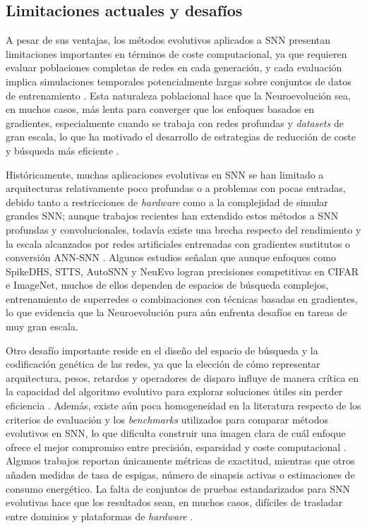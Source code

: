 \subsection{Limitaciones actuales y desafíos}
A pesar de sus ventajas, los métodos evolutivos aplicados a SNN presentan limitaciones importantes en términos de coste computacional, ya que requieren evaluar poblaciones completas de redes en cada generación, y cada evaluación implica simulaciones temporales potencialmente largas sobre conjuntos de datos de entrenamiento \cite{Schuman2022Opportunities, Schuman2020evooptineuro}. Esta naturaleza poblacional hace que la Neuroevolución sea, en muchos casos, más lenta para converger que los enfoques basados en gradientes, especialmente cuando se trabaja con redes profundas y \textit{datasets} de gran escala, lo que ha motivado el desarrollo de estrategias de reducción de coste y búsqueda más eficiente \cite{Shen2024EvolutionarySNN, Branquinho2023-neuro-conv-snn}.

Históricamente, muchas aplicaciones evolutivas en SNN se han limitado a arquitecturas relativamente poco profundas o a problemas con pocas entradas, debido tanto a restricciones de \textit{hardware} como a la complejidad de simular grandes SNN; aunque trabajos recientes han extendido estos métodos a SNN profundas y convolucionales, todavía existe una brecha respecto del rendimiento y la escala alcanzados por redes artificiales entrenadas con gradientes sustitutos o conversión ANN-SNN \cite{Branquinho2023-neuro-conv-snn, Schliebs2013snn-survey}. Algunos estudios \cite{Shen2024EvolutionarySNN} señalan que aunque enfoques como SpikeDHS, STTS, AutoSNN y NeuEvo logran precisiones competitivas en CIFAR e ImageNet, muchos de ellos dependen de espacios de búsqueda complejos, entrenamiento de superredes o combinaciones con técnicas basadas en gradientes, lo que evidencia que la Neuroevolución pura aún enfrenta desafíos en tareas de muy gran escala.

Otro desafío importante reside en el diseño del espacio de búsqueda y la codificación genética de las redes, ya que la elección de cómo representar arquitectura, pesos, retardos y operadores de disparo influye de manera crítica en la capacidad del algoritmo evolutivo para explorar soluciones útiles sin perder eficiencia \cite{Elbrecht2020-neuro-snn}. Además, existe aún poca homogeneidad en la literatura respecto de los criterios de evaluación y los \textit{benchmarks} utilizados para comparar métodos evolutivos en SNN, lo que dificulta construir una imagen clara de cuál enfoque ofrece el mejor compromiso entre precisión, esparsidad y coste computacional \cite{Shen2024EvolutionarySNN}. Algunos trabajos reportan únicamente métricas de exactitud, mientras que otros añaden medidas de tasa de espigas, número de sinapsis activas o estimaciones de consumo energético. La falta de conjuntos de pruebas estandarizados para SNN evolutivas hace que los resultados sean, en muchos casos, difíciles de trasladar entre dominios y plataformas de \textit{hardware} \cite{dimovska2020multiobjectiveoptimizationsizeresilience, Shen2024EvolutionarySNN}.

